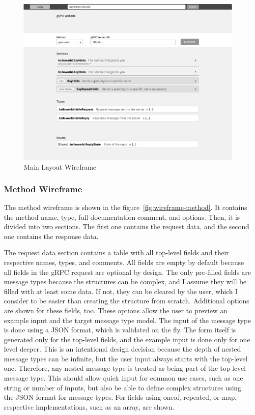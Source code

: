 \begin{figure}[hbt!]
    \centering
    \captionsetup{justification=centering}
    \includegraphics[width=1.0\textwidth]{images/design/wireframes/main-layout}
    \caption{Main Layout Wireframe}
    \label{fig:wireframe-main-layout}
\end{figure}

\subsubsection{Method Wireframe}
The method wireframe is shown in the figure~\ref{fig:wireframe-method}.
It contains the method name, type, full documentation comment, and options.
Then, it is divided into two sections.
The first one contains the request data, and the second one contains the response data.

The request data section contains a table with all top-level fields and their respective names, types, and comments.
All fields are empty by default because all fields in the gRPC request are optional by design.
The only pre-filled fields are message types because the structures can be complex, and I assume they will be filled with at least some data.
If not, they can be cleared by the user, which I consider to be easier than creating the structure from scratch.
Additional options are shown for these fields, too.
These options allow the user to preview an example input and the target message type model.
The input of the message type is done using a JSON format, which is validated on the fly.
The form itself is generated only for the top-level fields, and the example input is done only for one level deeper.
This is an intentional design decision because the depth of nested message types can be infinite, but the user input always starts with the top-level one.
Therefore, any nested message type is treated as being part of the top-level message type.
This should allow quick input for common use cases, such as one string or number of inputs, but also be able to define complex structures using the JSON format for message types.
For fields using oneof, repeated, or map, respective implementations, such as an array, are shown.

